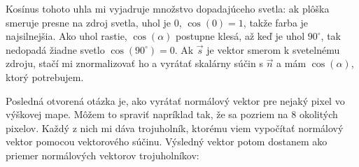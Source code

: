 {}


Kosínus tohoto uhla mi vyjadruje množstvo dopadajúceho svetla: ak plôška smeruje presne na zdroj svetla, uhol je $0$,
$\cos(0)=1$, takže farba je najsilnejšia. Ako uhol rastie, $\cos(\alpha)$ postupne klesá, až keď je uhol $90^\circ$,
tak nedopadá žiadne svetlo $\cos(90^\circ)=0$.
Ak $\vec s$ je vektor smerom k svetelnému zdroju, stačí mi znormalizovať ho
a vyrátať skalárny súčin s $\vec n$ a mám $\cos(\alpha)$, ktorý potrebujem.


Posledná otvorená otázka je, ako vyrátať normálový vektor pre nejaký pixel
vo výškovej mape. Môžem to spraviť napríklad tak, že sa pozriem na 8 okolitých pixelov. Každý z nich mi dáva trojuholník,
ktorému viem vypočítať normálový vektor pomocou vektorového súčinu. Výsledný vektor potom dostanem ako priemer 
normálových vektorov trojuholníkov:\\


